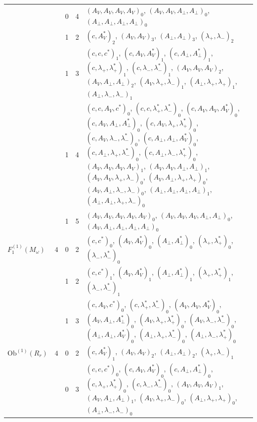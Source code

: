 \documentclass[11pt]{article}
\numberwithin{equation}{section}
\theoremstyle{plain}
\theoremstyle{definition}
\newcommand{\Ob}{\mathrm{Ob}}
\begin{document}
{\begin{longtable}{>{\raggedright}p{2.3cm}|p{0.6cm}|p{0.25cm}|p{0.25cm}|>{\raggedright\arraybackslash}p{11.6cm}}
 &  & 0 & 4 & $(A_V,A_V,A_V,A_V)_{0}$, $(A_V,A_V,A_\perp,A_\perp)_{0}$, $(A_\perp,A_\perp,A_\perp,A_\perp)_{0}$ \\
 &  & 1 & 2 & $(c,A^*_V)_{2}$, $(A_V,A_V)_{3}$, $(A_\perp,A_\perp)_{3}$, $(\lambda_+,\lambda_-)_{2}$ \\
 &  & 1 & 3 & $(c,c,c^*)_{1}$, $(c,A_V,A^*_V)_{1}$, $(c,A_\perp,A^*_\perp)_{1}$, $(c,\lambda_+,\lambda^*_+)_{1}$, $(c,\lambda_-,\lambda^*_-)_{1}$, $(A_V,A_V,A_V)_{2}$, $(A_V,A_\perp,A_\perp)_{2}$, $(A_V,\lambda_+,\lambda_-)_{1}$, $(A_\perp,\lambda_+,\lambda_+)_{1}$, $(A_\perp,\lambda_-,\lambda_-)_{1}$ \\
 &  & 1 & 4 & $(c,c,A_V,c^*)_{0}$, $(c,c,\lambda^*_+,\lambda^*_-)_{0}$, $(c,A_V,A_V,A^*_V)_{0}$, $(c,A_V,A_\perp,A^*_\perp)_{0}$, $(c,A_V,\lambda_+,\lambda^*_+)_{0}$, $(c,A_V,\lambda_-,\lambda^*_-)_{0}$, $(c,A_\perp,A_\perp,A^*_V)_{0}$, $(c,A_\perp,\lambda_+,\lambda^*_-)_{0}$, $(c,A_\perp,\lambda_-,\lambda^*_+)_{0}$, $(A_V,A_V,A_V,A_V)_{1}$, $(A_V,A_V,A_\perp,A_\perp)_{1}$, $(A_V,A_V,\lambda_+,\lambda_-)_{0}$, $(A_V,A_\perp,\lambda_+,\lambda_+)_{0}$, $(A_V,A_\perp,\lambda_-,\lambda_-)_{0}$, $(A_\perp,A_\perp,A_\perp,A_\perp)_{1}$, $(A_\perp,A_\perp,\lambda_+,\lambda_-)_{0}$ \\
 &  & 1 & 5 & $(A_V,A_V,A_V,A_V,A_V)_{0}$, $(A_V,A_V,A_V,A_\perp,A_\perp)_{0}$, $(A_V,A_\perp,A_\perp,A_\perp,A_\perp)_{0}$ \\
\hline
$F_1^{(1)}(M_\omega)$ & $4$ & 0 & 2 & $(c,c^*)_{0}$, $(A_V,A^*_V)_{0}$, $(A_\perp,A^*_\perp)_{0}$, $(\lambda_+,\lambda^*_+)_{0}$, $(\lambda_-,\lambda^*_-)_{0}$ \\
 &  & 1 & 2 & $(c,c^*)_{1}$, $(A_V,A^*_V)_{1}$, $(A_\perp,A^*_\perp)_{1}$, $(\lambda_+,\lambda^*_+)_{1}$, $(\lambda_-,\lambda^*_-)_{1}$ \\
 &  & 1 & 3 & $(c,A_V,c^*)_{0}$, $(c,\lambda^*_+,\lambda^*_-)_{0}$, $(A_V,A_V,A^*_V)_{0}$, $(A_V,A_\perp,A^*_\perp)_{0}$, $(A_V,\lambda_+,\lambda^*_+)_{0}$, $(A_V,\lambda_-,\lambda^*_-)_{0}$, $(A_\perp,A_\perp,A^*_V)_{0}$, $(A_\perp,\lambda_+,\lambda^*_-)_{0}$, $(A_\perp,\lambda_-,\lambda^*_+)_{0}$ \\
\hline
$\Ob^{(1)}(R_r)$ & $4$ & 0 & 2 & $(c,A^*_V)_{1}$, $(A_V,A_V)_{2}$, $(A_\perp,A_\perp)_{2}$, $(\lambda_+,\lambda_-)_{1}$ \\
 &  & 0 & 3 & $(c,c,c^*)_{0}$, $(c,A_V,A^*_V)_{0}$, $(c,A_\perp,A^*_\perp)_{0}$, $(c,\lambda_+,\lambda^*_+)_{0}$, $(c,\lambda_-,\lambda^*_-)_{0}$, $(A_V,A_V,A_V)_{1}$, $(A_V,A_\perp,A_\perp)_{1}$, $(A_V,\lambda_+,\lambda_-)_{0}$, $(A_\perp,\lambda_+,\lambda_+)_{0}$, $(A_\perp,\lambda_-,\lambda_-)_{0}$ \\

\end{longtable}}
\end{document}
